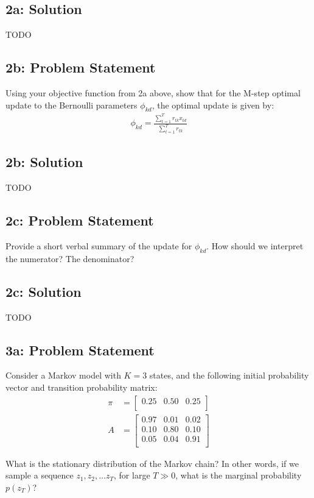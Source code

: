 \documentclass[10pt]{article}
\newcommand{\officialdirections}[1]{{\color{blue} #1}}
\begin{document}
\subsection{2a: Solution}

TODO


\newpage
\officialdirections{
\subsection*{2b: Problem Statement}
Using your objective function from 2a above, show that for the M-step optimal update to the Bernoulli parameters $\phi_{kd}$, the optimal update is given by:
\begin{align}
\phi_{kd} = \frac{ \sum_{t=1}^T r_{tk} x_{td} }{ \sum_{t=1}^T r_{tk} }
\end{align}
}

\subsection{2b: Solution}

TODO


\officialdirections{
\subsection*{2c: Problem Statement}
Provide a short verbal summary of the update for $\phi_{kd}$. How should we interpret the numerator? The denominator?
}

\subsection{2c: Solution}

TODO



\officialdirections{
\subsection*{3a: Problem Statement}
Consider a Markov model with $K=3$ states, and the following initial probability vector and transition probability matrix:
\begin{align}
  \pi &=
  \left[ {\begin{array}{ccc}
   0.25 & 0.50 & 0.25 \\
  \end{array} } \right]
\\
  A &=
  \left[ {\begin{array}{ccc}
   0.97 & 0.01 & 0.02 \\
   0.10 & 0.80 & 0.10 \\
   0.05 & 0.04 & 0.91 \\
  \end{array} } \right]
\end{align}

What is the stationary distribution of the Markov chain?
In other words, if we sample a sequence $z_1, z_2, \ldots z_T$, for large $T \gg 0$, what is the marginal probability $p(z_T)$? 

}
\end{document}
